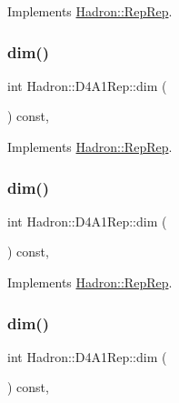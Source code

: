 Implements \mbox{\hyperlink{structHadron_1_1RepRep_a92c8802e5ed7afd7da43ccfd5b7cd92b}{Hadron\+::\+Rep\+Rep}}.

\mbox{\label{structHadron_1_1D4A1Rep_ae553df618a4dc5019fa2b0d1c43443b0}} 
\subsubsection{\texorpdfstring{dim()}{dim()}\hspace{0.1cm}{\footnotesize\ttfamily [3/5]}}
{\footnotesize\ttfamily int Hadron\+::\+D4\+A1\+Rep\+::dim (\begin{DoxyParamCaption}{ }\end{DoxyParamCaption}) const\hspace{0.3cm}{\ttfamily [inline]}, {\ttfamily [virtual]}}



Implements \mbox{\hyperlink{structHadron_1_1RepRep_a92c8802e5ed7afd7da43ccfd5b7cd92b}{Hadron\+::\+Rep\+Rep}}.

\mbox{\label{structHadron_1_1D4A1Rep_ae553df618a4dc5019fa2b0d1c43443b0}} 
\subsubsection{\texorpdfstring{dim()}{dim()}\hspace{0.1cm}{\footnotesize\ttfamily [4/5]}}
{\footnotesize\ttfamily int Hadron\+::\+D4\+A1\+Rep\+::dim (\begin{DoxyParamCaption}{ }\end{DoxyParamCaption}) const\hspace{0.3cm}{\ttfamily [inline]}, {\ttfamily [virtual]}}



Implements \mbox{\hyperlink{structHadron_1_1RepRep_a92c8802e5ed7afd7da43ccfd5b7cd92b}{Hadron\+::\+Rep\+Rep}}.

\mbox{\label{structHadron_1_1D4A1Rep_ae553df618a4dc5019fa2b0d1c43443b0}} 
\subsubsection{\texorpdfstring{dim()}{dim()}\hspace{0.1cm}{\footnotesize\ttfamily [5/5]}}
{\footnotesize\ttfamily int Hadron\+::\+D4\+A1\+Rep\+::dim (\begin{DoxyParamCaption}{ }\end{DoxyParamCaption}) const\hspace{0.3cm}{\ttfamily [inline]}, {\ttfamily [virtual]}}



